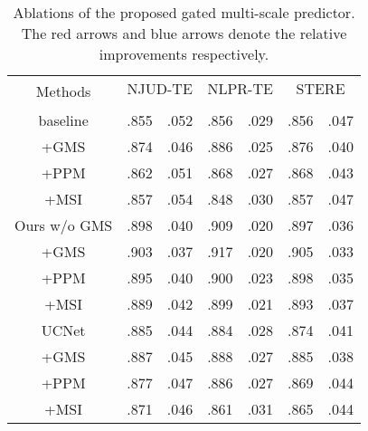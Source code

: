 \documentclass[journal]{IEEEtran}
\begin{document}
\linespread{1.3}
\begin{table}[]
\caption{Ablations of the proposed gated multi-scale predictor. The red arrows {\color{red}} and blue arrows {\color{blue}} denote the relative improvements respectively. }
\label{table: GMS generalization}
\begin{center}
\renewcommand\tabcolsep{1.0pt}
\begin{tabular}{c|cc|cc|cc}
\hline
\multirow{2}{*}{Methods} & \multicolumn{2}{c|}{NJUD-TE} & \multicolumn{2}{c|}{NLPR-TE} & \multicolumn{2}{c}{STERE} \\
      &  &  &  &  &  &  \\ \hline
baseline & .855 & .052 & .856 & .029 & .856 & .047  \\
+GMS  & .874{\color{red}} & .046 & .886{\color{red}} & .025 & .876{\color{red}} & .040  \\
+PPM  & .862{\color{red}} & .051 & .868{\color{red}} & .027 & .868{\color{red}} & .043  \\
+MSI  & .857{\color{red}} & .054 & .848{\color{blue}} & .030 & .857{\color{red}} & .047  \\ \hline
Ours w/o GMS  & .898 & .040 & .909 & .020 & .897 & .036  \\
+GMS  & .903{\color{red}} & .037 & .917{\color{red}} & .020 & .905{\color{red}} & .033 \\
+PPM  & .895{\color{blue}} & .040 & .900{\color{blue}} & .023 & .898{\color{red}} & .035  \\
+MSI  & .889{\color{blue}} & .042 & .899{\color{blue}} & .021 & .893{\color{blue}} & .037 \\ \hline
UCNet \cite{zhang2020uc} & .885 & .044 & .884 & .028 & .874 & .041 \\
+GMS  & .887{\color{red}}  & .045 & .888{\color{red}} & .027 & .885{\color{red}} & .038 \\
+PPM  & .877{\color{blue}} & .047 & .886{\color{red}} & .027 & .869{\color{blue}} & .044 \\
+MSI  & .871{\color{blue}}  & .046 & .861{\color{blue}} & .031 & .865{\color{blue}} & .044 \\ \hline
\end{tabular}
\end{center}
\end{table}
\linespread{1}
\end{document}
